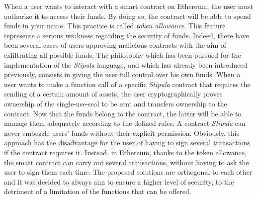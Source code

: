 When a user wants to interact with a smart contract on Ethereum, the user must authorize it to access their 
funds. By doing so, the contract will be able to spend funds in your name. This practice is called 
\textit{token allowance}. This feature represents a serious weakness regarding the security of funds. 
Indeed, there have been several cases of users approving malicious contracts with the aim of exfiltrating all 
possible funds. The philosophy which has been pursued for the implementation of the \textit{Stipula} 
language, and which has already been introduced previously, consists in giving the user full control over 
his own funds. When a user wants to make a function call of a specific \textit{Stipula} contract that 
requires the sending of a certain amount of assets, the user cryptographically proves ownership of the 
single-use-seal to be sent and transfers ownership to the contract. Now that the funds belong to the 
contract, the latter will be able to manage them adequately according to the defined rules. A contract 
\textit{Stipula} can never embezzle users' funds without their explicit permission. Obviously, this approach 
has the disadvantage for the user of having to sign several transactions if the contract requires it. 
Instead, in Ethereum, thanks to the token allowance, the smart contract can carry out several transactions, 
without having to ask the user to sign them each time. The proposed solutions are orthogonal to each other 
and it was decided to always aim to ensure a higher level of security, to the detriment of a limitation of 
the functions that can be offered.
